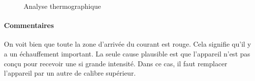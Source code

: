 \begin{figure}[ht]
\centering
{}
\caption{Analyse thermographique}
\label{fig:analyse_thermo}
\end{figure}
\pagebreak
\paragraph{Commentaires}
On voit bien  que toute la zone d'arrivée du courant est rouge. Cela signifie qu'il y a un échauffement important. La seule cause plausible est que l'appareil n'est pas conçu pour recevoir  une si grande intensité. Dans ce cas, il faut remplacer l'appareil par un autre de calibre supérieur.
